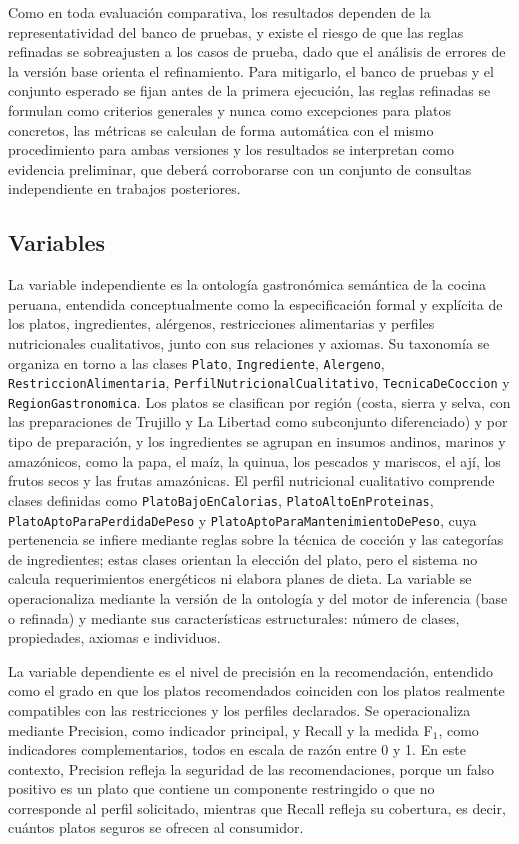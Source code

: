 \documentclass[conference]{IEEEtran}
\begin{document}
Como en toda evaluación comparativa, los resultados dependen de la representatividad del banco de pruebas, y existe el riesgo de que las reglas refinadas se sobreajusten a los casos de prueba, dado que el análisis de errores de la versión base orienta el refinamiento. Para mitigarlo, el banco de pruebas y el conjunto esperado se fijan antes de la primera ejecución, las reglas refinadas se formulan como criterios generales y nunca como excepciones para platos concretos, las métricas se calculan de forma automática con el mismo procedimiento para ambas versiones y los resultados se interpretan como evidencia preliminar, que deberá corroborarse con un conjunto de consultas independiente en trabajos posteriores.

\subsection{Variables}
La variable independiente es la ontología gastronómica semántica de la cocina peruana, entendida conceptualmente como la especificación formal y explícita de los platos, ingredientes, alérgenos, restricciones alimentarias y perfiles nutricionales cualitativos, junto con sus relaciones y axiomas. Su taxonomía se organiza en torno a las clases \texttt{Plato}, \texttt{Ingrediente}, \texttt{Alergeno}, \texttt{RestriccionAlimentaria}, \texttt{PerfilNutricionalCualitativo}, \texttt{TecnicaDeCoccion} y \texttt{RegionGastronomica}. Los platos se clasifican por región (costa, sierra y selva, con las preparaciones de Trujillo y La Libertad como subconjunto diferenciado) y por tipo de preparación, y los ingredientes se agrupan en insumos andinos, marinos y amazónicos, como la papa, el maíz, la quinua, los pescados y mariscos, el ají, los frutos secos y las frutas amazónicas. El perfil nutricional cualitativo comprende clases definidas como \texttt{PlatoBajoEnCalorias}, \texttt{PlatoAltoEnProteinas}, \texttt{PlatoAptoParaPerdidaDePeso} y \texttt{PlatoAptoParaMantenimientoDePeso}, cuya pertenencia se infiere mediante reglas sobre la técnica de cocción y las categorías de ingredientes; estas clases orientan la elección del plato, pero el sistema no calcula requerimientos energéticos ni elabora planes de dieta. La variable se operacionaliza mediante la versión de la ontología y del motor de inferencia (base o refinada) y mediante sus características estructurales: número de clases, propiedades, axiomas e individuos.

La variable dependiente es el nivel de precisión en la recomendación, entendido como el grado en que los platos recomendados coinciden con los platos realmente compatibles con las restricciones y los perfiles declarados. Se operacionaliza mediante Precision, como indicador principal, y Recall y la medida F$_1$, como indicadores complementarios, todos en escala de razón entre 0 y 1. En este contexto, Precision refleja la seguridad de las recomendaciones, porque un falso positivo es un plato que contiene un componente restringido o que no corresponde al perfil solicitado, mientras que Recall refleja su cobertura, es decir, cuántos platos seguros se ofrecen al consumidor.
\end{document}

